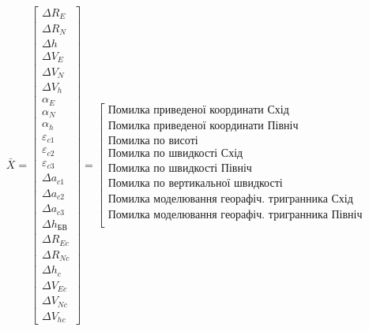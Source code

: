 \begin{equation}
\label{eq:state_vector}
\bar{X}= \left[ \begin{array}{l}
{\Delta R_{E}}\\
{\Delta R_{N}}\\
{\Delta h}\\
{\Delta V_{E}}\\
{\Delta V_{N}}\\
{\Delta V_{h}}\\
{\alpha_{E}}\\
{\alpha_{N}}\\
{\alpha_{h}}\\
{\varepsilon_{c1}}\\
{\varepsilon_{c2}}\\
{\varepsilon_{c3}}\\
{\Delta a_{c1}} \\
{ \Delta a_{c2}}\\
{\Delta a_{c3}}\\
{\Delta h_{\text{БВ}}}\\
{\Delta R_{Ec}}\\
{\Delta R_{Nc}}\\
{\Delta h_{c}}\\
{\Delta V_{Ec}}\\
{\Delta V_{Nc}}\\
{\Delta V_{hc}}
\end{array} \right]=
\left[\begin{array}{l}
{\text{Помилка приведеної координати Схід}}\\
{\text{Помилка приведеної координати Північ}}\\
{\text{Помилка по висоті}}\\
{\text{Помилка по швидкості Схід}}\\
{\text{Помилка по швидкості Північ}}\\
{\text{Помилка по вертикальної швидкості}}\\
{\text{Помилка моделювання георафіч. тригранника Схід}}\\
{\text{Помилка моделювання георафіч. тригранника Північ}}\\

\end{array}
\end{equation}
